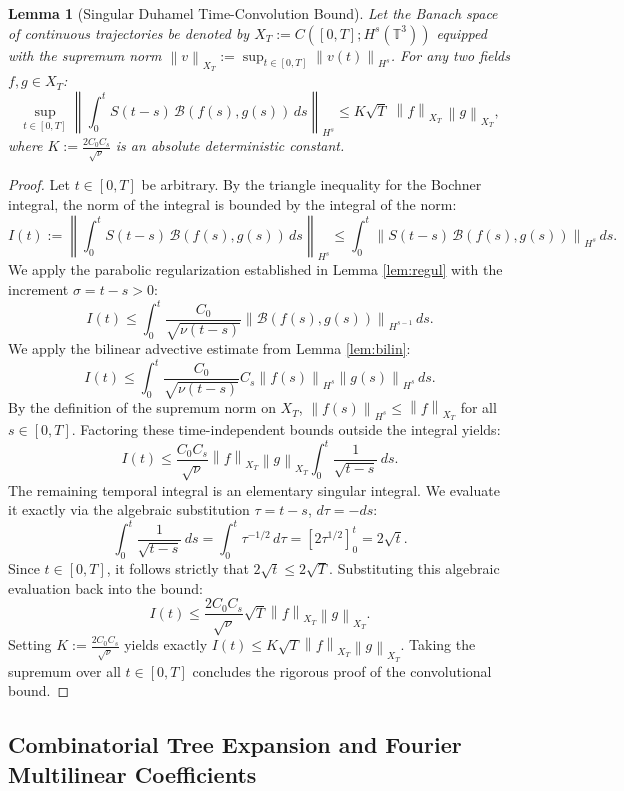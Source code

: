 \documentclass[12pt,a4paper]{article}
\theoremstyle{plain}
\newtheorem{lemma}[theorem]{Lemma}
\theoremstyle{definition}
\theoremstyle{remark}
\newcommand{\Hs}{H^s}
\newcommand{\T}{\mathbb{T}}
\newcommand{\norm}[1]{\left\|#1\right\|}
\newcommand{\BB}{\mathcal{B}}
\begin{document}
\begin{lemma}[Singular Duhamel Time-Convolution Bound]
\label{lem:duhamel}
Let the Banach space of continuous trajectories be denoted by $X_T := C([0,T];\Hs(\T^3))$ equipped with the supremum norm $\norm{v}_{X_T} := \sup_{t \in [0,T]} \norm{v(t)}_{H^s}$. For any two fields $f, g \in X_T$:
\[
  \sup_{t \in [0,T]} \left\| \int_0^t S(t-s)\,\BB(f(s),g(s))\,ds \right\|_{H^s} \le K\sqrt{T}\;\norm{f}_{X_T}\,\norm{g}_{X_T},
\]
where $K := \frac{2C_0 C_s}{\sqrt{\nu}}$ is an absolute deterministic constant.
\end{lemma}

\begin{proof}
Let $t \in [0,T]$ be arbitrary. By the triangle inequality for the Bochner integral, the norm of the integral is bounded by the integral of the norm:
\[
  I(t) := \left\| \int_0^t S(t-s)\,\BB(f(s),g(s))\,ds \right\|_{H^s} \le \int_0^t \norm{S(t-s)\,\BB(f(s),g(s))}_{H^s}\,ds.
\]
We apply the parabolic regularization established in Lemma \ref{lem:regul} with the increment $\sigma = t-s > 0$:
\[
  I(t) \le \int_0^t \frac{C_0}{\sqrt{\nu(t-s)}} \norm{\BB(f(s),g(s))}_{H^{s-1}} \,ds.
\]
We apply the bilinear advective estimate from Lemma \ref{lem:bilin}:
\[
  I(t) \le \int_0^t \frac{C_0}{\sqrt{\nu(t-s)}} C_s \norm{f(s)}_{H^s} \norm{g(s)}_{H^s} \,ds.
\]
By the definition of the supremum norm on $X_T$, $\norm{f(s)}_{H^s} \le \norm{f}_{X_T}$ for all $s \in [0,T]$. Factoring these time-independent bounds outside the integral yields:
\[
  I(t) \le \frac{C_0 C_s}{\sqrt{\nu}} \norm{f}_{X_T} \norm{g}_{X_T} \int_0^t \frac{1}{\sqrt{t-s}} \,ds.
\]
The remaining temporal integral is an elementary singular integral. We evaluate it exactly via the algebraic substitution $\tau = t-s$, $d\tau = -ds$:
\[
  \int_0^t \frac{1}{\sqrt{t-s}} \,ds = \int_0^t \tau^{-1/2} \,d\tau = \left[ 2\tau^{1/2} \right]_0^t = 2\sqrt{t}.
\]
Since $t \in [0,T]$, it follows strictly that $2\sqrt{t} \le 2\sqrt{T}$. Substituting this algebraic evaluation back into the bound:
\[
  I(t) \le \frac{2C_0 C_s}{\sqrt{\nu}} \sqrt{T} \norm{f}_{X_T} \norm{g}_{X_T}.
\]
Setting $K := \frac{2C_0 C_s}{\sqrt{\nu}}$ yields exactly $I(t) \le K\sqrt{T} \norm{f}_{X_T} \norm{g}_{X_T}$. Taking the supremum over all $t \in [0,T]$ concludes the rigorous proof of the convolutional bound.
\end{proof}


\subsection{Combinatorial Tree Expansion and Fourier Multilinear Coefficients}
\label{subsec:tree_expansion}
\end{document}
